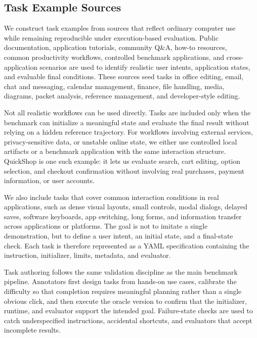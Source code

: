 \subsection{Task Example Sources}
\label{sub:task_exam_srcs}
We construct task examples from sources that reflect ordinary computer use while remaining reproducible under execution-based evaluation. Public documentation, application tutorials, community Q\&A, how-to resources, common productivity workflows, controlled benchmark applications, and cross-application scenarios are used to identify realistic user intents, application states, and evaluable final conditions. These sources seed tasks in office editing, email, chat and messaging, calendar management, finance, file handling, media, diagrams, packet analysis, reference management, and developer-style editing.

Not all realistic workflows can be used directly. Tasks are included only when the benchmark can initialize a meaningful state and evaluate the final result without relying on a hidden reference trajectory. For workflows involving external services, privacy-sensitive data, or unstable online state, we either use controlled local artifacts or a benchmark application with the same interaction structure. QuickShop is one such example: it lets us evaluate search, cart editing, option selection, and checkout confirmation without involving real purchases, payment information, or user accounts.

We also include tasks that cover common interaction conditions in real applications, such as dense visual layouts, small controls, modal dialogs, delayed saves, software keyboards, app switching, long forms, and information transfer across applications or platforms. The goal is not to imitate a single demonstration, but to define a user intent, an initial state, and a final-state check. Each task is therefore represented as a YAML specification containing the instruction, initializer, limits, metadata, and evaluator.

Task authoring follows the same validation discipline as the main benchmark pipeline. Annotators first design tasks from hands-on use cases, calibrate the difficulty so that completion requires meaningful planning rather than a single obvious click, and then execute the oracle version to confirm that the initializer, runtime, and evaluator support the intended goal. Failure-state checks are used to catch underspecified instructions, accidental shortcuts, and evaluators that accept incomplete results.

